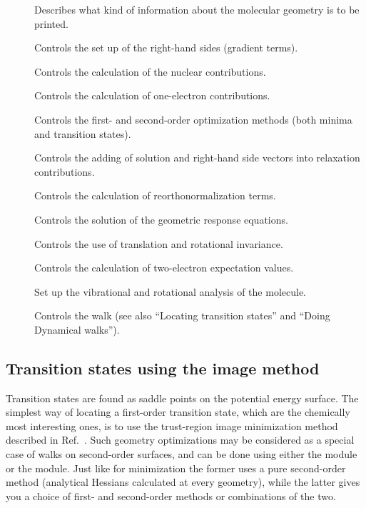 \begin{description}
\item[] Describes what kind  of information about the
molecular geometry is to be printed.
\item[] Controls the set up of the right-hand sides
(gradient terms).
\item[] Controls the calculation of the nuclear contributions.
\item[] Controls the calculation of one-electron contributions.
\item[] Controls the first- and second-order
optimization methods (both minima and transition states).
\item[] Controls the adding of solution and right-hand side vectors
into relaxation contributions.
\item[] Controls the calculation of reorthonormalization terms.
\item[] Controls the solution of the geometric response equations.
\item[] Controls the use of translation and rotational invariance.
\item[] Controls the calculation of two-electron
expectation values.
\item[] Set up the vibrational and rotational analysis of the
molecule.
\item[] Controls the walk (see also ``Locating transition
states'' and ``Doing Dynamical walks'').
\end{description}

\subsection{Transition states using the image method}
\label{sec:image}

\begin{center}
\end{center}

Transition states are found as saddle points
on the potential energy surface.
The simplest way of locating a first-order transition state, which are the
chemically most interesting ones, is to use the trust-region
image minimization method
described in Ref.~\cite{thcpl182}. Such geometry optimizations may
be considered as a special case of walks on second-order surfaces, and
can be done using either the  module or the 
module. Just like for minimization the former uses a pure second-order
method (analytical Hessians calculated at every geometry), while the
latter gives you a choice of first- and second-order methods or
combinations of the two.

